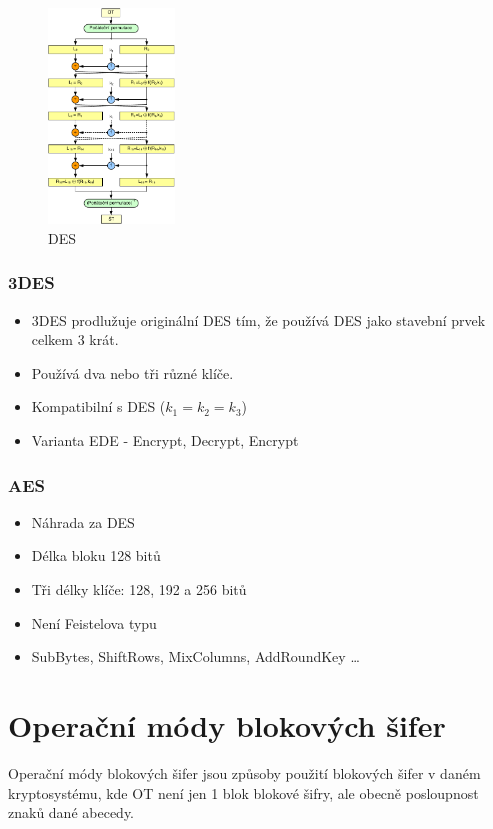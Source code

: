 \documentclass{szzclass}
\begin{document}
\begin{figure}[!ht]
  \centering
  \includegraphics[width=0.3\textwidth]{topics/bi-spol-07/images/des}
  \caption{DES}
\end{figure}

\subsubsection{3DES}
\begin{itemize}
\item 3DES prodlužuje originální DES tím, že používá DES jako stavební prvek celkem 3 krát.
\item Používá dva nebo tři různé klíče.
\item Kompatibilní s DES ($k_1=k_2=k_3$)
\item Varianta EDE - Encrypt, Decrypt, Encrypt
\end{itemize}

\subsubsection{AES}
\begin{itemize}
\item Náhrada za DES
\item Délka bloku 128 bitů
\item Tři délky klíče: 128, 192 a 256 bitů 
\item Není Feistelova typu
\item SubBytes, ShiftRows, MixColumns, AddRoundKey \dots
\end{itemize}

\section{Operační módy blokových šifer}
Operační módy blokových šifer jsou způsoby použití blokových šifer v daném kryptosystému, kde OT není jen 1 blok blokové šifry, ale obecně posloupnost znaků dané abecedy.
\end{document}
